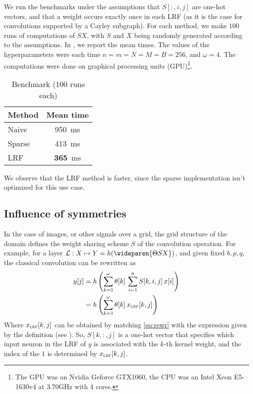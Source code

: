 We run the benchmarks under the assumptions that $S[:,i,j]$ are one-hot vectors, and that a weight occurs exactly once in each LRF (as it is the case for convolutions supported by a Cayley subgraph). For each method, we make $100$ runs of computations of $SX$, with $S$ and $X$ being randomly generated according to the assumptions. In , we report the mean times. The values of the hyperparameters were each time $n = m = N = M = B = 256$, and $\omega = 4$. The computations were done on graphical processing units (GPU)\footnote{The GPU was an Nvidia Geforce GTX1060, the CPU was an Intel Xeon E5-1630v4 at 3.70GHz with 4 cores.}.

\begin{table}[H]
  \centering
\begin{tabular}{lc}
  Method & Mean time\\
  \hline
  Naive & 950~ms\\
  Sparse & 413~ms\\
  LRF & \textbf{365}~ms
\end{tabular}
\caption{Benchmark (100 runs each)}
\label{tab:ben}
\end{table}

We observe that the LRF method is faster, since the sparse implementation isn't optimized for this use case.

\subsection{Influence of symmetries}
\label{sec:sym}

In the case of images, or other signals over a grid, the grid structure of the domain defines the weight sharing scheme $S$ of the convolution operation. For example, for a layer $\cl : X  \mapsto Y = h(\wideparen{\Theta S X})$, and given fixed $b,p,q$, the classical convolution can be rewritten as
\begin{align}
y[j] &= h\left(\displaystyle \sum_{k=1}^{\omega} \theta[k] \h{2} \sum_{i=1}^n S[k,i,j] \h{2} x[i] \right)\\
&= h\left(\displaystyle \sum_{k=1}^{\omega} \theta[k] \h{2} x_{\LRF}[k,j] \right) \label{eq:rewr}
\end{align}
Where $x_{\LRF}[k,j]$ can be obtained by matching \eqref{eq:rewr} with the expression given by the definition (see ). So, $S[k,:,j]$ is a one-hot vector that specifies which input neuron in the LRF of $y$ is associated with the $k$-th kernel weight, and the index of the $1$ is determined by $x_{\LRF}[k,j]$.

